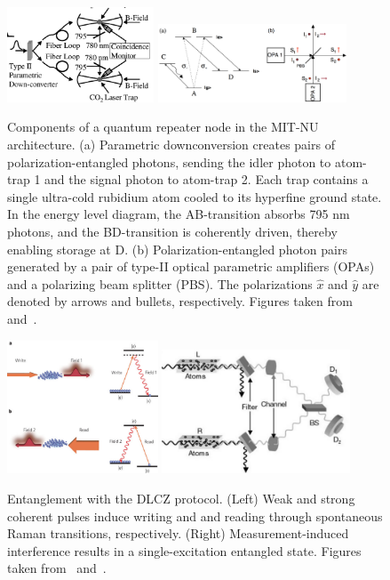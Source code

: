 \documentclass[aps,twocolumn,secnumarabic,amsmath,amssymb,pra,groupedaddress,
showpacs, showkeys]{revtex4-1}
\begin{document}
\begin{figure}[t]
	\centering
	\includegraphics[width=0.39\textwidth]{figures/node}
  	\includegraphics[width=0.50\textwidth]{figures/level_structure_opa1}
	\caption{Components of a quantum repeater node in the MIT-NU architecture. (a) Parametric downconversion creates pairs of polarization-entangled photons, sending the idler photon to atom-trap 1 and the signal photon to atom-trap 2. Each trap contains a single ultra-cold rubidium atom cooled to its hyperfine ground state. In the energy level diagram, the AB-transition absorbs 795 nm photons, and the BD-transition is coherently driven, thereby enabling storage at D. (b) Polarization-entangled photon pairs generated by a pair of type-II optical parametric amplifiers (OPAs) and a polarizing beam splitter (PBS). The polarizations $\hat{x}$ and $\hat{y}$ are denoted by arrows and bullets, respectively. Figures taken from~\cite{PhysRevLett.87.167903} and~\cite{1464-4266-2-1-101}.}
	\label{fig:diagram}
\end{figure}

\begin{figure}[t]
	\centering
	\includegraphics[width=0.40\textwidth]{figures/dlcz}
  	\includegraphics[width=0.50\textwidth]{figures/dlcz_entanglement}
	\caption{Entanglement with the DLCZ protocol. (Left) Weak and strong coherent pulses induce writing and and reading through spontaneous Raman transitions, respectively. (Right) Measurement-induced interference results in a single-excitation entangled state.  Figures taken from~\cite{nature07127} and~\cite{nature35106500}.}
	\label{fig:dlcz}
\end{figure}
\end{document}
